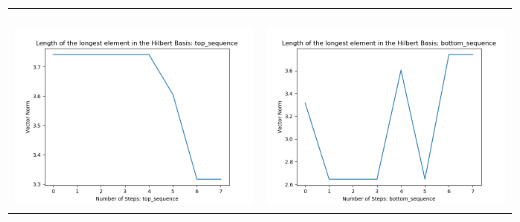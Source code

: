\documentclass[10pt]{article}
\begin{document}
\begin{tabular}{c|c}
\begin{minipage}{.45\textwidth}
\end{minipage} \\ \\
\hline \\\begin{minipage}{.45\textwidth}
\includegraphics[width=\textwidth]{"DATA/4d/4 generators 2 bound E/top_sequence LENGTH"}
\end{minipage} &
\begin{minipage}{.45\textwidth}
\includegraphics[width=\textwidth]{"DATA/4d/4 generators 2 bound E bottomup/bottom_sequence LENGTH"}
\end{minipage}
\end{tabular}
\end{document}
